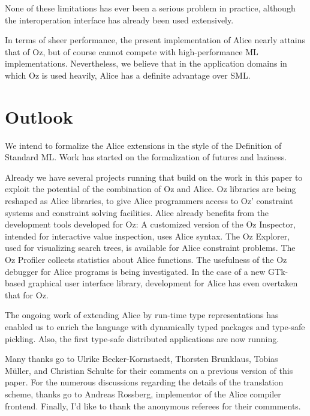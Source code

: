 \documentclass{entcs}
\begin{document}
\noindent None of these limitations has ever been a serious problem in
practice, although the interoperation interface has already been used
extensively.

In terms of sheer performance, the present implementation of Alice nearly
attains that of Oz, but of course cannot compete with high-performance ML
implementations.  Nevertheless, we believe that in the application domains
in which Oz is used heavily, Alice has a definite advantage over SML.


\section{Outlook}\label{outlook}

We intend to formalize the Alice extensions in the style of the Definition
of Standard ML.  Work has started on the formalization of futures and laziness.

Already we have several projects running that build on the work in this paper
to exploit the potential of the combination of Oz and Alice.  Oz libraries
are being reshaped as Alice libraries, to give Alice programmers access to
Oz' constraint systems and constraint solving facilities.  Alice already
benefits from the development tools developed for Oz:  A customized version
of the Oz Inspector, intended for interactive value inspection, uses Alice
syntax.  The Oz Explorer, used for visualizing search trees, is available
for Alice constraint problems.  The Oz Profiler collects statistics about
Alice functions.  The usefulness of the Oz debugger for Alice programs
is being investigated.  In the case of a new GTk-based graphical user
interface library, development for Alice has even overtaken that for Oz.

The ongoing work of extending Alice by run-time type representations has
enabled us to enrich the language with dynamically typed packages and
type-safe pickling.  Also, the first type-safe distributed applications
are now running.



\ack

Many thanks go to Ulrike Becker-Kornstaedt, Thorsten Brunklaus, Tobias
M\"{u}ller, and Christian Schulte for their comments on a previous version
of this paper.  For the numerous discussions regarding the details of
the translation scheme, thanks go to Andreas Rossberg, implementor of
the Alice compiler frontend.  Finally, I'd like to thank the anonymous
referees for their commments.
\end{document}
